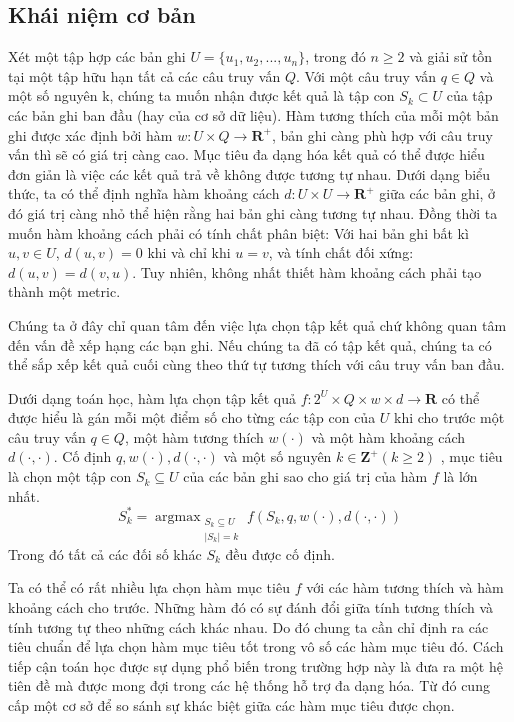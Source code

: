 \documentclass[12pt]{report}
\DeclareMathOperator*{\argmax}{argmax}
\begin{document}
\subsection{Khái niệm cơ bản}
Xét một tập hợp các bản ghi $U=\{u_1, u_2, ..., u_n\}$, trong đó $n \geq 2$
và giải sử tồn tại một tập hữu hạn tất cả các câu truy vấn $Q$. 
Với một câu truy vấn $q \in Q$ và một số nguyên k, chúng ta muốn nhận được kết quả là tập con $S_k \subset U$ của tập các bản ghi ban đầu (hay của cơ sở dữ liệu). 
Hàm tương thích của mỗi một bản ghi được xác định bởi hàm 
$w: U \times Q \to \mathbf{R}^+$, bản ghi càng phù hợp với câu truy vấn 
thì sẽ có giá trị càng cao. Mục tiêu đa dạng hóa kết quả có thể được hiểu đơn giản là việc các kết quả trả về không được tương tự nhau. Dưới dạng biểu thức, ta có thể định nghĩa hàm khoảng cách $d: U \times U \to \mathbf{R}^+$ giữa các bản ghi, ở đó giá trị càng nhỏ thể hiện rằng hai bản ghi càng tương tự nhau. Đồng thời ta muốn hàm khoảng cách phải có tính chất phân biệt: Với hai bản ghi bất kì $u, v \in U$, $d(u, v) = 0$ khi và chỉ khi $u = v$, và tính chất đối xứng: $d(u, v) = d(v, u)$. Tuy nhiên, không nhất thiết hàm khoảng cách phải tạo thành một metric. 

Chúng ta ở đây chỉ quan tâm đến việc lựa chọn tập kết quả chứ không quan tâm đến vấn đề xếp hạng các bạn ghi. Nếu chúng ta đã có tập kết quả, chúng ta có thể sắp xếp kết quả cuối cùng theo thứ tự tương thích với câu truy vấn ban đầu. 

Dưới dạng toán học, hàm lựa chọn tập kết quả $f: 2^U \times Q \times w \times d \to \mathbf{R}$ có thể được hiểu là gán mỗi một điểm số cho từng các tập con của $U$ khi cho trước một câu truy vấn $q \in Q$, một hàm tương 
thích $w(\cdot)$ và một hàm khoảng cách $d(\cdot, \cdot)$.
Cố định $q, w(\cdot), d(\cdot, \cdot)$ và một số nguyên $k \in \mathbf{Z}^+ (k \geq 2)$
, mục tiêu là chọn một tập con $S_k \subseteq U$ của các bản ghi sao cho giá trị của hàm $f$ là lớn nhất. 
$$S^*_k = \argmax_{\substack{S_k \subseteq U \\ |S_k| = k}}
f(S_k, q, w(\cdot), d(\cdot, \cdot)) $$
Trong đó tất cả các đối số khác $S_k$ đều được cố định. 

Ta có thể có rất nhiều lựa chọn hàm mục tiêu $f$ với 
các hàm tương thích và hàm khoảng cách cho trước. 
Những hàm đó có sự đánh đổi giữa tính tương thích và tính 
tương tự theo những cách khác nhau. 
Do đó chung ta cần chỉ định ra các 
tiêu chuẩn để lựa chọn hàm mục tiêu tốt trong vô số các hàm mục tiêu đó.
Cách tiếp cận toán học được sự dụng 
phổ biến trong trường hợp này là đưa ra 
một hệ tiên đề mà được mong đợi trong các hệ thống hỗ trợ đa dạng hóa. 
Từ đó cung cấp một cơ sở để so sánh sự khác biệt giữa các hàm mục tiêu được chọn. 
\end{document}
